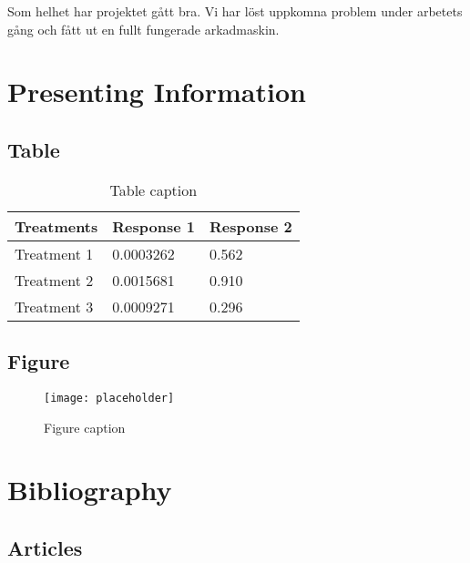 \documentclass[12pt,fleqn,openany]{book} %
\begin{document}
Som helhet har projektet gått bra. Vi har löst uppkomna problem under arbetets gång och fått ut en fullt fungerade arkadmaskin. 


\chapter{Presenting Information}

\section{Table}

\begin{table}[h]
\centering
\begin{tabular}{l l l}
\toprule
\textbf{Treatments} & \textbf{Response 1} & \textbf{Response 2}\\
\midrule
Treatment 1 & 0.0003262 & 0.562 \\
Treatment 2 & 0.0015681 & 0.910 \\
Treatment 3 & 0.0009271 & 0.296 \\
\bottomrule
\end{tabular}
\caption{Table caption}
\end{table}


\section{Figure}

\begin{figure}[h]
\centering\texttt{[image: placeholder]}
\caption{Figure caption}
\end{figure}


\chapter*{Bibliography}


\section*{Articles}
\printbibliography[heading=bibempty,type=article]
\end{document}
